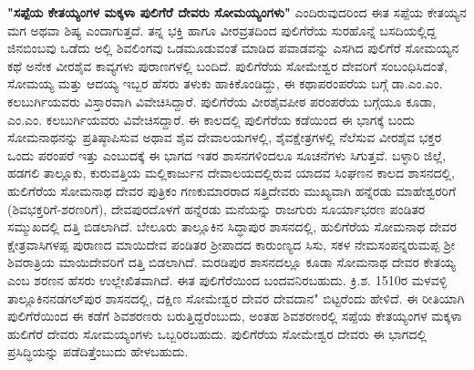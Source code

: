 \textbf{"ಸಪ್ಪೆಯ ಕೇತಯ್ಯಂಗಳ ಮಕ್ಕಳಾ ಪುಲಿಗೆರೆ ದೇವರು ಸೋಮಯ್ಯಂಗಳು"} ಎಂದಿರುವುದರಿಂದ ಈತ ಸಪ್ಪೆಯ ಕೇತಯ್ಯನ ಮಗ ಅಥವಾ ಶಿಷ್ಯ ಎಂದಾಗುತ್ತದೆ. ತನ್ನ ಭಕ್ತಿ ಹಾಗೂ ವೀರವ್ರತದಿಂದ ಪುಲಿಗೆರೆಯ ಸುರಹೊನ್ನೆ ಬಸದಿಯಲ್ಲಿದ್ದ ಜಿನಬಿಂಬವು ಒಡೆದು ಅಲ್ಲಿ ಶಿವಲಿಂಗವು ಒಡಮೂಡುವಂತೆ ಮಾಡಿದ ಪವಾಡವನ್ನು ಎಸಗಿದ ಪುಲಿಗೆರೆ ಸೋಮಯ್ಯನ ಕಥೆ ಅನೇಕ ವೀರಶೈವ ಕಾವ್ಯಗಳು ಪುರಾಣಗಳಲ್ಲಿ ಬಂದಿದೆ. ಪುಲಿಗೆರೆಯ ಸೋಮೇಶ್ವರ ದೇವರಿಗೆ ಸಂಬಂಧಿಸಿದಂತೆ, ಸೋಮಯ್ಯ ಮತ್ತು ಆದಯ್ಯ ಇಬ್ಬರ ಹೆಸರು ತಳುಕು ಹಾಕಿಕೊಂಡಿದ್ದು, ಈ ಕಥಾಪರಂಪರೆಯ ಬಗ್ಗೆ ಡಾ.ಎಂ.ಎಂ. ಕಲಬುರ್ಗಿಯವರು ವಿಸ್ತಾರವಾಗಿ ವಿವೇಚಿಸಿದ್ದಾರೆ. ಪುಲಿಗೆರೆಯ ವೀರಶೈವಪೀಠ ಪರಂಪರೆಯ ಬಗ್ಗೆಯೂ ಕೂಡಾ, ಎಂ.ಎಂ. ಕಲಬುರ್ಗಿಯವರು ವಿವೇಚಿಸದ್ದಾರೆ. ಈ ಕಾಲದಲ್ಲಿ ಪುಲಿಗೆರೆಯ ಕಡೆಯಿಂದ ಈ ಭಾಗಕ್ಕೆ ಬಂದು ಸೋಮನಾಥನನ್ನು ಪ್ರತಿಷ್ಠಾಪಿಸುವ ಅಥಾವ ಶೈವ ದೇವಾಲಯಗಳಲ್ಲಿ, ಶೈವಕ್ಷೇತ್ರಗಳಲ್ಲಿ ನೆಲೆಸುವ ವೀರಶೈವ ಭಕ್ತರ ಒಂದು ಪರಂಪರೆ ಇತ್ತು ಎಂಬುದಕ್ಕೆ ಈ ಭಾಗದ ಇತರ ಶಾಸನಗಳಿಂದಲೂ ಸೂಚನೆಗಳು ಸಿಗುತ್ತವೆ. ಬಳ್ಳಾರಿ ಜಿಲ್ಲೆ, ಹಡಗಲಿ ತಾಲ್ಲೂಕು, ಕುರುವತ್ತಿಯ ಮಲ್ಲಿಕಾರ್ಜುನ ದೇವಾಲಯದಲ್ಲಿರುವ ಯಾದವ ಸಿಂಘಣನ ಕಾಲದ ಶಾಸನದಲ್ಲಿ, ಹುಲಿಗೆರೆಯ ಸೋಮನಾಥ ದೇವರ ಪುತ್ರಿಕಂ ಗಣಕುಮಾರರಾದ ಸತ್ತಿದೇವರು ಮುಖ್ಯವಾಗಿ ಹನ್ನೆರಡು ಮಾಹೇಶ್ವರರಿಗೆ (ಶಿವಭಕ್ತರಿಗೆ-ಶರಣರಿಗೆ), ದೇವಪುರದೊಳಗೆ ಹನ್ನೆರಡು ಮನೆಯನ್ನು ರಾಜಗುರು ಸೂರ್ಯಾಭರಣ ಪಂಡಿತರ ಸಮ್ಮುಖದಲ್ಲಿ ದತ್ತಿ ಬಿಡಲಾಗಿದೆ. ಬೇಲೂರು ತಾಲ್ಲೂಕಿನ ಸಿದ್ಧಾಪುರ ಶಾಸನದಲ್ಲಿ, ಹುಲಿಗೆರೆಯ ಸೋಮನಾಥ ದೇವರ ಕ್ಷೇತ್ರವಾಸಿಗಳಪ್ಪ ಪುರಾಣದ ಮಾಯಿದೇವ ಪಂಡಿತರ ಶ‍್ರೀಪಾದದ ಕಾರುಂಣ್ಯದ ಸಿಸು, ಸಕಳ ನೇಮಸಂಪನ್ನರುಮಪ್ಪ ಶ‍್ರೀ ಶಿವರಾತ್ರಿಯ ಮಾಯಿದೇವರಿಗೆ ದತ್ತಿ ಬಿಡಲಾಗಿದೆ. ಮರಡಿಪುರ ಶಾಸನದಲ್ಲೂ ಕೂಡಾ ಸೋಮನಾಥ ದೇವರ ಕೇತಯ್ಯ ಎಂಬ ಶರಣನ ಹೆಸರು ಉಲ್ಲೇಖಿತವಾಗಿದೆ. ಈತ ಪುಲಿಗೆರೆಯಿಂದ ಬಂದವನಿರಬಹುದು. ಕ್ರಿ.ಶ. 1510ರ ಮಳವಳ್ಳಿ ತಾಲ್ಲೂಕಿನ\break ನಡಗಲ್​ಪುರ ಶಾಸನದಲ್ಲಿ, ದಕ್ಷಿಣ ಸೋಮೇಶ್ವರ ದೇವರ ದೇವದಾನ" ಬಿಟ್ಟರೆಂದು ಹೇಳಿದೆ. ಈ ರೀತಿಯಾಗಿ ಪುಲಿಗೆರೆಯಿಂದ ಈ ಕಡೆಗೆ ಶಿವಶರಣರು ಬರುತ್ತಿದ್ದರೆಂಬುದು, ಅಂತಹ ಶಿವಶರಣರಲ್ಲಿ ಸಪ್ಪೆಯ ಕೇತಯ್ಯಂಗಳ ಮಕ್ಕಳಾ ಹುಲಿಗೆರೆ ದೇವರು ಸೋಮಯ್ಯಂಗಳು ಒಬ್ಬರಿರಬಹುದು. ಪುಲಿಗೆರೆಯ ಸೋಮೇಶ್ವರ ದೇವರು ಈ ಭಾಗದಲ್ಲಿ ಪ್ರಸಿದ್ಧಿಯನ್ನು ಪಡೆದಿತ್ತೆಂಬುದು ಹೇಳಬಹುದು.

